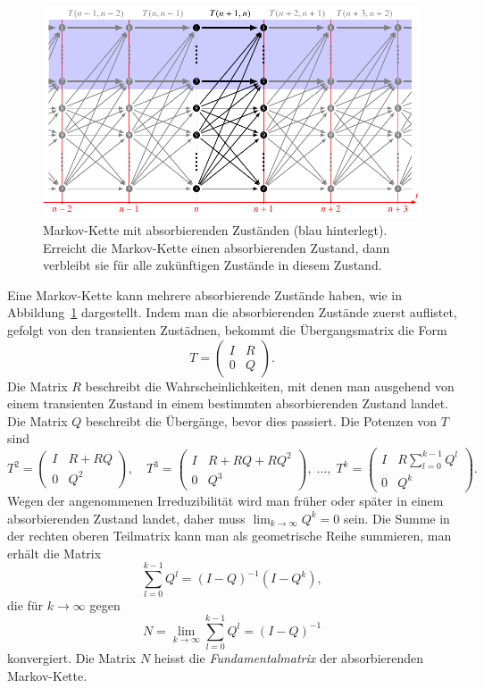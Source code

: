 \begin{figure}
\centering
\includegraphics{chapters/80-wahrscheinlichkeit/images/markov3.pdf}
\caption{Markov-Kette mit absorbierenden Zuständen (blau hinterlegt).
Erreicht die Markov-Kette einen absorbierenden Zustand, dann verbleibt
sie für alle zukünftigen Zustände in diesem Zustand.
\label{buch:wahrscheinlichkeit:fig:abs}}
\end{figure}

Eine Markov-Kette kann mehrere absorbierende Zustände haben, wie in
Abbildung~\ref{buch:wahrscheinlichkeit:fig:abs} dargestellt.
Indem man die absorbierenden Zustände zuerst auflistet, gefolgt von
den transienten Zustädnen, bekommt die Übergangsmatrix die Form
\[
T=
\left(
\begin{array}{c|c}
I&R\\
\hline
0&Q
\end{array}
\right).
\]
Die Matrix $R$ beschreibt die Wahrscheinlichkeiten, mit denen man
ausgehend von einem transienten Zustand
in einem bestimmten absorbierenden Zustand landet.
Die Matrix $Q$ beschreibt die Übergänge, bevor dies passiert.
Die Potenzen von $T$ sind
\[
T^2
=
\left(
\begin{array}{c|c}
I&R+RQ \\
\hline
0&Q^2
\end{array}
\right),
\quad
T^3
=
\left(
\begin{array}{c|c}
I&R+RQ+RQ^2 \\
\hline
0&Q^3
\end{array}
\right),
\;
\dots,
\;
T^k
=
\left(
\begin{array}{c|c}
I&\displaystyle R\sum_{l=0}^{k-1} Q^l \\
\hline
0&Q^k
\end{array}
\right).
\]
Wegen der angenommenen Irreduzibilität wird man
früher oder später in einem absorbierenden Zustand landet,
daher muss $\lim_{k\to\infty} Q^k=0$ sein.
Die Summe in der rechten oberen Teilmatrix kann man als geometrische
Reihe summieren, man erhält die Matrix
\[
\sum_{l=0}^{k-1} Q^l = (I-Q)^{-1}(I-Q^k),
\]
die für $k\to\infty$ gegen
\[
N
=
\lim_{k\to\infty} \sum_{l=0}^{k-1} Q^l
=
(I-Q)^{-1}
\]
konvergiert.
Die Matrix $N$ heisst die {\em Fundamentalmatrix} der absorbierenden
Markov-Kette.
%

